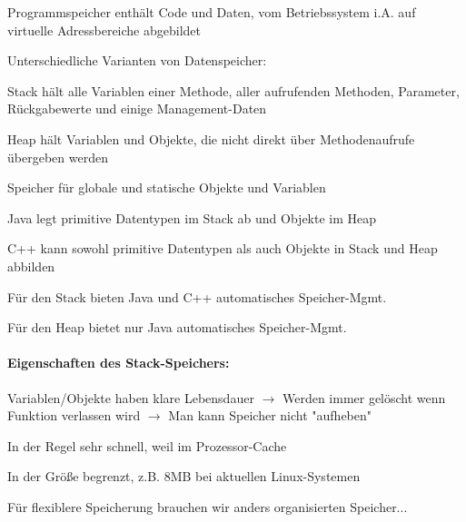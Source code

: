 \documentclass[10pt]{article}
\begin{document}
\begin{itemize*}
  \item Programmspeicher enthält Code und Daten, vom Betriebssystem i.A. auf virtuelle Adressbereiche abgebildet
  \item Unterschiedliche Varianten von Datenspeicher:
  \begin{itemize*}
    \item Stack hält alle Variablen einer Methode, aller aufrufenden Methoden, Parameter, Rückgabewerte und einige Management-Daten
    \item Heap hält Variablen und Objekte, die nicht direkt über Methodenaufrufe übergeben werden
    \item Speicher für globale und statische Objekte und Variablen
  \end{itemize*}
  \item Java legt primitive Datentypen im Stack ab und Objekte im Heap
  \item C++ kann sowohl primitive Datentypen als auch Objekte in Stack und Heap abbilden
  \item Für den Stack bieten Java und C++ automatisches Speicher-Mgmt.
  \item Für den Heap bietet nur Java automatisches Speicher-Mgmt.
\end{itemize*}

\paragraph{Eigenschaften des Stack-Speichers:}
\begin{itemize*}
  \item Variablen/Objekte haben klare Lebensdauer $\rightarrow$ Werden immer gelöscht wenn Funktion verlassen wird  $\rightarrow$ Man kann Speicher nicht "aufheben"
  \item In der Regel sehr schnell, weil im Prozessor-Cache
  \item In der Größe begrenzt, z.B. 8MB bei aktuellen Linux-Systemen
  \item Für flexiblere Speicherung brauchen wir anders organisierten Speicher...
\end{itemize*}
\end{document}
